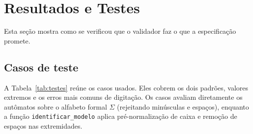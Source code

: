 \section{Resultados e Testes}
\label{sec:testes}

Esta seção mostra como se verificou que o validador faz o que a
especificação promete.

\subsection{Casos de teste}

A Tabela~\ref{tab:testes} reúne os casos usados. Eles cobrem os
dois padrões, valores extremos e os erros mais comuns de
digitação. Os casos avaliam diretamente os autômatos sobre o alfabeto
formal $\Sigma$ (rejeitando minúsculas e espaços), enquanto a função
\texttt{identificar\_modelo} aplica pré-normalização de caixa e
remoção de espaços nas extremidades.

